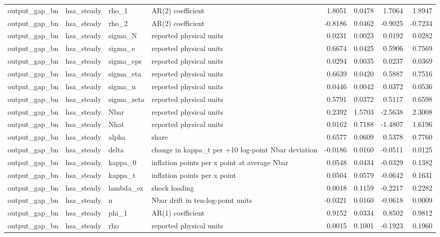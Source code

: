\begin{tabular}{llllrrrr}
output\_gap\_bn & hsa\_steady & rho\_1 & AR(2) coefficient & 1.8051 & 0.0478 & 1.7064 & 1.8947 \\
output\_gap\_bn & hsa\_steady & rho\_2 & AR(2) coefficient & -0.8186 & 0.0462 & -0.9025 & -0.7234 \\
output\_gap\_bn & hsa\_steady & sigma\_N & reported physical units & 0.0231 & 0.0023 & 0.0192 & 0.0282 \\
output\_gap\_bn & hsa\_steady & sigma\_e & reported physical units & 0.6674 & 0.0425 & 0.5906 & 0.7569 \\
output\_gap\_bn & hsa\_steady & sigma\_eps & reported physical units & 0.0294 & 0.0035 & 0.0237 & 0.0369 \\
output\_gap\_bn & hsa\_steady & sigma\_eta & reported physical units & 0.6639 & 0.0420 & 0.5887 & 0.7516 \\
output\_gap\_bn & hsa\_steady & sigma\_u & reported physical units & 0.0446 & 0.0042 & 0.0372 & 0.0536 \\
output\_gap\_bn & hsa\_steady & sigma\_zeta & reported physical units & 0.5791 & 0.0372 & 0.5117 & 0.6598 \\
output\_gap\_bn & hsa\_steady & Nbar & reported physical units & 0.2392 & 1.5703 & -2.5638 & 2.3008 \\
output\_gap\_bn & hsa\_steady & Nhat & reported physical units & 0.0162 & 0.7188 & -1.4807 & 1.6196 \\
output\_gap\_bn & hsa\_steady & alpha & share & 0.6577 & 0.0609 & 0.5378 & 0.7760 \\
output\_gap\_bn & hsa\_steady & delta & change in kappa\_t per +10 log-point Nbar deviation & -0.0186 & 0.0160 & -0.0511 & 0.0125 \\
output\_gap\_bn & hsa\_steady & kappa\_0 & inflation points per x point at average Nbar & 0.0548 & 0.0434 & -0.0329 & 0.1382 \\
output\_gap\_bn & hsa\_steady & kappa\_t & inflation points per x point & 0.0504 & 0.0579 & -0.0642 & 0.1631 \\
output\_gap\_bn & hsa\_steady & lambda\_ez & shock loading & 0.0018 & 0.1159 & -0.2217 & 0.2282 \\
output\_gap\_bn & hsa\_steady & n & Nbar drift in ten-log-point units & -0.0321 & 0.0160 & -0.0618 & 0.0009 \\
output\_gap\_bn & hsa\_steady & phi\_1 & AR(1) coefficient & 0.9152 & 0.0334 & 0.8502 & 0.9812 \\
output\_gap\_bn & hsa\_steady & rho & reported physical units & 0.0015 & 0.1001 & -0.1923 & 0.1960 \\

\end{tabular}
